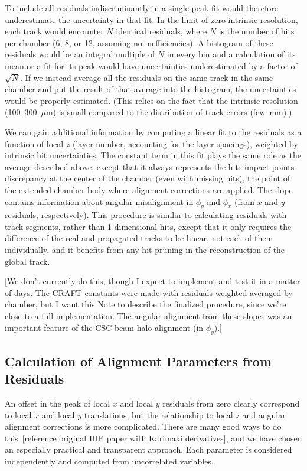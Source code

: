 \documentclass[12pt]{article}
\begin{document}
To include all residuals indiscriminantly in a single peak-fit would
therefore underestimate the uncertainty in that fit.  In the limit of
zero intrinsic resolution, each track would encounter $N$ identical
residuals, where $N$ is the number of hits per chamber (6, 8, or 12,
assuming no inefficiencies).  A histogram of these residuals would be
an integral multiple of $N$ in every bin and a calculation of its mean
or a fit for its peak would have uncertainties underestimated by a
factor of $\sqrt{N}$.  If we instead average all the residuals on the
same track in the same chamber and put the result of that average into
the histogram, the uncertainties would be properly estimated.  (This
relies on the fact that the intrinsic resolution (100--300~$\mu$m) is
small compared to the distribution of track errors (few~mm).)

We can gain additional information by computing a linear fit to the
residuals as a function of local $z$ (layer number, accounting for the
layer spacings), weighted by intrinsic hit uncertainties.  The
constant term in this fit plays the same role as the average described
above, except that it always represents the hits-impact points
discrepancy at the center of the chamber (even with missing hits), the
point of the extended chamber body where alignment corrections are
applied.  The slope contains information about angular misalignment in
$\phi_y$ and $\phi_x$ (from $x$ and $y$ residuals, respectively).
This procedure is similar to calculating residuals with track
segments, rather than 1-dimensional hits, except that it only requires
the difference of the real and propagated tracks to be linear, not
each of them individually, and it benefits from any hit-pruning in the
reconstruction of the global track.

[We don't currently do this, though I expect to implement and test it
  in a matter of days.  The CRAFT constants were made with residuals
  weighted-averaged by chamber, but I want this Note to describe the
  finalized procedure, since we're close to a full implementation.
  The angular alignment from these slopes was an important feature of
  the CSC beam-halo alignment (in $\phi_y$).]

\subsection{Calculation of Alignment Parameters from Residuals}

An offset in the peak of local $x$ and local $y$ residuals from zero
clearly correspond to local $x$ and local $y$ translations, but the
relationship to local $z$ and angular alignment corrections is more
complicated.  There are many good ways to do this~[reference original
  HIP paper with Karimaki derivatives], and we have chosen an
especially practical and transparent approach.  Each parameter is
considered independently and computed from uncorrelated variables.
\end{document}
